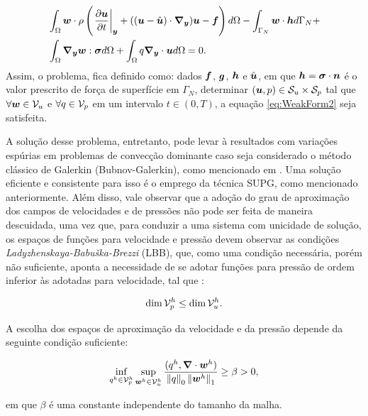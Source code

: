\begin{equation}
    \begin{split}
        &\int_{\Omega}{\boldsymbol{w}\cdot\rho\left({\left.\frac{\partial \boldsymbol{u}}{\partial t}\right|_{\boldsymbol{y}}+((\boldsymbol{u}-\hat{\boldsymbol{u}})\cdot\boldsymbol{\nabla_y})\boldsymbol{u}-\boldsymbol{f}}\right) d\Omega}-\int_{\Gamma_N}{\boldsymbol{w}\cdot\boldsymbol{h} d\Gamma_N}+\\
        &\int_{\Omega}{\boldsymbol{\nabla_y}\boldsymbol{w}:\boldsymbol{\sigma} d\Omega}+\int_{\Omega}{q\boldsymbol{\nabla_y}\cdot\boldsymbol{u} d\Omega}=0\text{.}
    \end{split}
    \label{eq:WeakForm2}
\end{equation}
Assim, o problema, fica definido como: dados $\boldsymbol{f}$, $\boldsymbol{g}$, $\boldsymbol{h}$ e $\hat{\boldsymbol{u}}$, em que $\boldsymbol{h}=\boldsymbol{\sigma}\cdot\boldsymbol{n}$ é o valor prescrito de força de superfície em $\Gamma_N$, determinar $(\boldsymbol{u},p)\in\mathcal{S}_u\times\mathcal{S}_p$ tal que $\forall\boldsymbol{w}\in\mathcal{V}_u$ e $\forall q\in\mathcal{V}_p$ em um intervalo $t\in(0,T)$, a equação \eqref{eq:WeakForm2} seja satisfeita.

A solução desse problema, entretanto, pode levar à resultados com variações espúrias em problemas de convecção dominante caso seja considerado o método clássico de Galerkin (Bubnov-Galerkin), como mencionado em \cite{fernandes2020tecnica,donea2003finite,brooks1982streamline}. Uma solução eficiente e consistente para isso é o emprego da técnica SUPG, como mencionado anteriormente. Além disso, vale observar que a adoção do grau de aproximação dos campos de velocidades e de pressões não pode ser feita de maneira descuidada, uma vez que, para conduzir a uma sistema com unicidade de solução, os espaços de funções para velocidade e pressão devem observar as condições \textit{Ladyzhenskaya-Babuška-Brezzi} (LBB), que, como uma condição necessária, porém não suficiente, aponta a necessidade de se adotar funções para pressão de ordem inferior às adotadas para velocidade, tal que \cite{donea2003finite}:

\begin{equation}
    \dim{\mathcal{V}_p^h}\leq\dim{\mathcal{V}_u^h}\text{.}
\end{equation}

A escolha dos espaços de aproximação da velocidade e da pressão depende da seguinte condição suficiente:

\begin{equation}
    \inf_{q^h\in\mathcal{V}_p^h}{\sup_{\boldsymbol{w}^h\in\mathcal{V}_u^h}{\frac{(q^h,\boldsymbol{\nabla}\cdot\boldsymbol{w}^h)}{\left\lVert{q}\right\lVert_0\left\lVert{\boldsymbol{w}^h}\right\lVert_1}}}\geq\beta>0\text{,}
\end{equation}

\noindent em que $\beta$ é uma constante independente do tamanho da malha.

